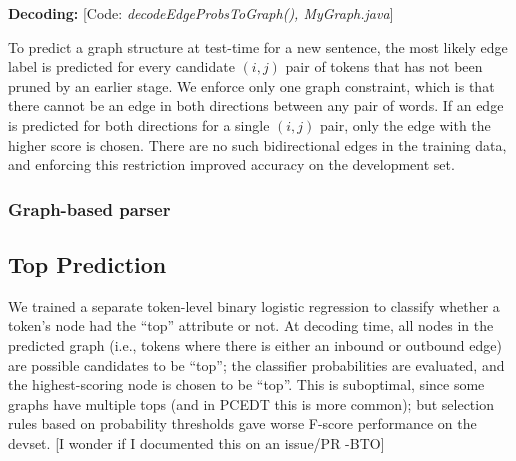 \documentclass[11pt]{article}
\newcommand{\bocomment}[1]{\textcolor{Bittersweet}{[#1 -BTO]}}
\newcommand{\codenote}[1]{\textcolor{PineGreen}{[Code: \emph{#1}]}}
\newcommand{\noedge}{\textsc{NoEdge}}
\begin{document}


\textbf{Decoding:}
\codenote{decodeEdgeProbsToGraph(), MyGraph.java}

To predict a graph structure at test-time for a new sentence,
the most likely edge label is predicted for every candidate $(i, j)$ pair of
tokens that has not been pruned by an earlier stage.
We enforce only one graph constraint, which is that there cannot be
an edge in both directions between any pair of words.
If an edge is predicted for both directions for a single $(i, j)$
pair, only the edge with the higher score is chosen.
There are no such bidirectional edges in the training data, and enforcing this
restriction improved accuracy on the development set.%



\subsubsection{Graph-based parser} \label{s:graphparser}

\subsection{Top Prediction} \label{s:top_model}

We trained a separate token-level binary logistic regression to classify
whether a token's node had the ``top'' attribute or not.
At decoding time, all nodes in the predicted graph (i.e., tokens where there is
either an inbound or outbound edge) are possible candidates to be ``top'';
the classifier probabilities are evaluated, and the highest-scoring node is
chosen to be ``top''.
This is suboptimal, since some graphs have multiple tops (and in PCEDT this is
more common);
but selection rules based on probability thresholds gave worse F-score
performance on the devset. \bocomment{I wonder if I documented this on an issue/PR}
\end{document}

